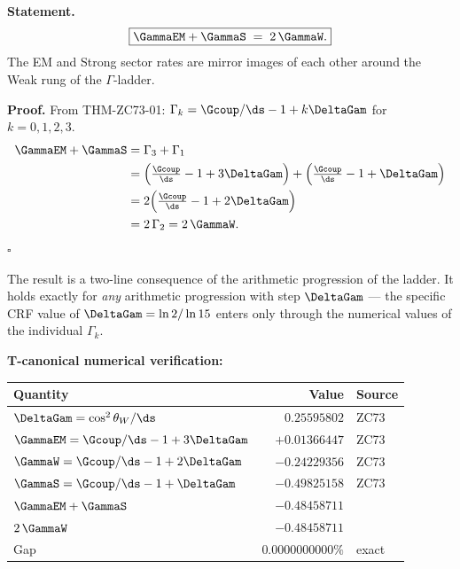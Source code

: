 \documentclass[12pt, a4paper]{article}
\begin{document}
\begin{giftbox}[title={FIND-ZC81-01: Ladder Mirror Symmetry
  ($R_0$, Exact --- Gift)}]

\textbf{Statement.}
\begin{equation}
  \boxed{
    \GammaEM + \GammaS \;=\; 2\,\GammaW.
  }
  \label{eq:mirror}
\end{equation}
The EM and Strong sector rates are mirror images of each other
around the Weak rung of the $\Gamma$-ladder.

\textbf{Proof.}
From THM-ZC73-01:
$\Gamma_k = \Gcoup/\ds - 1 + k\DeltaGam$ for $k = 0,1,2,3$.
\begin{align*}
  \GammaEM + \GammaS
  &= \Gamma_3 + \Gamma_1 \\
  &= \left(\tfrac{\Gcoup}{\ds}-1+3\DeltaGam\right)
     +\left(\tfrac{\Gcoup}{\ds}-1+\DeltaGam\right) \\
  &= 2\!\left(\tfrac{\Gcoup}{\ds}-1+2\DeltaGam\right) \\
  &= 2\,\Gamma_2 = 2\,\GammaW.
\end{align*}
\hfill$\square$

The result is a two-line consequence of the arithmetic progression
of the ladder. It holds exactly for \emph{any} arithmetic
progression with step $\DeltaGam$ --- the specific CRF value of
$\DeltaGam = \ln 2/\ln 15$ enters only through the numerical
values of the individual $\Gamma_k$.

\textbf{T-canonical numerical verification:}
\begin{center}
{\small\renewcommand{\arraystretch}{1.25}
\begin{tabular}{@{}lrl@{}}
\toprule
Quantity & Value & Source \\
\midrule
$\DeltaGam = \cos^2\theta_W/\ds$  & $0.25595802$ & ZC73 \\
$\GammaEM = \Gcoup/\ds-1+3\DeltaGam$ & $+0.01366447$ & ZC73 \\
$\GammaW  = \Gcoup/\ds-1+2\DeltaGam$ & $-0.24229356$ & ZC73 \\
$\GammaS  = \Gcoup/\ds-1+\DeltaGam$  & $-0.49825158$ & ZC73 \\
$\GammaEM + \GammaS$               & $-0.48458711$ & \\
$2\,\GammaW$                       & $-0.48458711$ & \\
Gap                                & $0.0000000000\%$ & exact \\
\bottomrule
\end{tabular}}
\end{center}


\end{giftbox}
\end{document}
